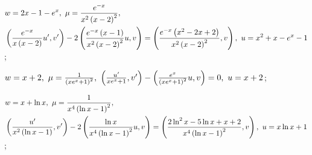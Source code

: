 \begin{enumsolsfull}
		\item \( \begin{aligned} &w = 2x - 1 - e^x, ~ \mu = \frac{e^{-x}}{x^2 \left( x - 2 \right)^2}, \\ &\left( \frac{e^{-x}}{x \left( x-2 \right)} u', v' \right) - 2 \left( \frac{e^{-x} \left( x-1 \right)}{x^2 \left( x - 2 \right)^2} u, v \right) = \left( \frac{e^{-x} \left( x^2 - 2x + 2 \right)}{x^2 \left( x - 2 \right)^2}, v \right), ~ u = x^2 + x - e^x - 1 \end{aligned} \); %
		\item \( w = x + 2, ~ \mu = \frac{1}{\left( xe^x + 1 \right)^2}, ~ \left( \frac{u'}{xe^x + 1}, v' \right) - \left( \frac{e^x}{\left( xe^x + 1 \right)^2} u, v \right) = 0, ~ u = x + 2 \); %
		\item \( \begin{aligned} &w = x + \ln{x}, ~ \mu = \frac{1}{x^4 \left( \ln{x} - 1 \right)^2}, \\ &\left( \frac{u'}{x^2 \left( \ln{x} - 1 \right)}, v' \right) - 2 \left( \frac{\ln{x}}{x^4 \left( \ln{x} - 1 \right)^2} u, v \right) = \left( \frac{2\ln^2{x} - 5 \ln{x} + x + 2}{x^4 \left( \ln{x} - 1 \right)^2}, v \right), ~ u = x \ln{x} + 1 \end{aligned} \); %

	\end{enumsolsfull}

